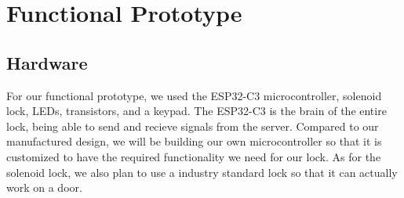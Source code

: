 \newpage %
\section{Functional Prototype}


\subsection{Hardware}

For our functional prototype, we used the ESP32-C3 microcontroller, solenoid lock, LEDs, transistors, and a keypad. The ESP32-C3 is the brain of the entire lock, being able to send and recieve signals from the server. Compared to our manufactured design, we will be building our own microcontroller so that it is customized to have the required functionality we need for our lock. As for the solenoid lock, we also plan to use a industry standard lock so that it can actually work on a door. 
